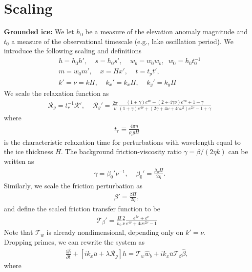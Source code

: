 \documentclass[paper=a4, fontsize=11pt]{article}
\begin{document}
\section*{Scaling}
\textbf{Grounded ice:}
We let $h_0$ be a measure of the elevation anomaly magnitude and
$t_0$ a measure of the observational timescale (e.g., lake oscillation period).
We introduce the following scaling and definitions
\begin{align}
& h = h_0 h', \;\;\;\; s = h_0 s',\;\;\;\; w_b = w_0 w_{b} , \;\; w_0 = h_0 t_0^{-1} \\
& m = w_0 m',\;\;\;\; x = Hx', \;\;\;\;
t = t_p t', \;\;\;\;\\
& k' = \nu = kH , \;\;\;\; k_x' = k_x H,\;\;\;\; k_y' = k_y H
\end{align}
We scale the relaxation function as
\begin{align}
   &\mathcal{R}_g = t_r^{-1} \mathcal{R}', \;\;\;\;
 \mathcal{R}_g' =  \frac{2\pi}{\nu}\frac{ (1+\gamma)e^{4\nu} -(2+4\gamma\nu)e^{2\nu} +1-\gamma  }{ (1+\gamma)e^{4\nu} + (2\gamma+4\nu+4\gamma\nu^2)e^{2\nu} -1 + \gamma  }
\end{align}
where
\begin{align}
t_r \equiv \frac{4\pi\eta}{\rho_i g H}
\end{align}
is the characteristic relaxation time for perturbations with wavelength equal to the ice thickness $H$.
The background friction-viscosity ratio $\gamma=\beta/(2\eta k)$ can be written as
\begin{align}
   &\gamma = \beta_0' \nu^{-1}, \;\;\;\; \beta_0' = \frac{\beta_0 H}{2\eta}.
\end{align}
Similarly, we scale the friction perturbation as
\begin{align}
\beta' = \frac{ \beta H}{2\eta},
\end{align}
and define the scaled friction transfer function to be
\begin{align}
\mathcal{T}_{\beta}' =  \frac{H}{h_0}\frac{2}{\nu}\frac{e^{3\nu} + e^{\nu}}{e^{4\nu} +4\nu e^{2\nu} -1 }
\end{align}
Note that $\mathcal{T}_w$ is already nondimensional, depending only on $k' = \nu$.
\\
Dropping primes, we can rewrite the system as
\begin{align}
\frac{\partial \hat{h}}{\partial t} +\left[ik_x \bar{u} + \lambda\mathcal{R}_g \right]\hat{h} = \mathcal{T}_w\hat{w}_b +  {ik_x\bar{u}} \mathcal{T}_{\beta}\hat{\beta}, \label{dhhatsc}
\end{align}
where
\end{document}
